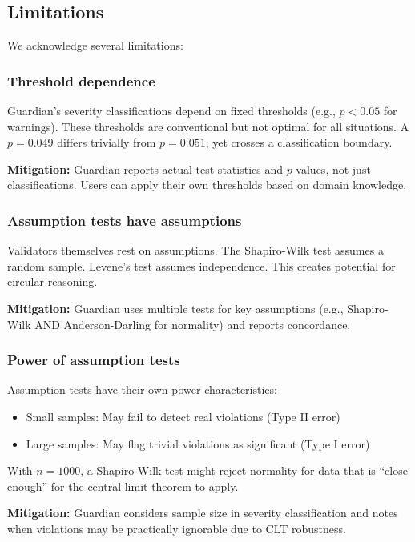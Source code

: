 \documentclass[article]{jss}
\begin{document}
\subsection{Limitations}

We acknowledge several limitations:

\subsubsection{Threshold dependence}

Guardian's severity classifications depend on fixed thresholds (e.g., $p < 0.05$ for warnings). These thresholds are conventional but not optimal for all situations. A $p = 0.049$ differs trivially from $p = 0.051$, yet crosses a classification boundary.

\textbf{Mitigation:} Guardian reports actual test statistics and $p$-values, not just classifications. Users can apply their own thresholds based on domain knowledge.

\subsubsection{Assumption tests have assumptions}

Validators themselves rest on assumptions. The Shapiro-Wilk test assumes a random sample. Levene's test assumes independence. This creates potential for circular reasoning.

\textbf{Mitigation:} Guardian uses multiple tests for key assumptions (e.g., Shapiro-Wilk AND Anderson-Darling for normality) and reports concordance.

\subsubsection{Power of assumption tests}

Assumption tests have their own power characteristics:
\begin{itemize}
\item Small samples: May fail to detect real violations (Type II error)
\item Large samples: May flag trivial violations as significant (Type I error)
\end{itemize}

With $n = 1000$, a Shapiro-Wilk test might reject normality for data that is ``close enough'' for the central limit theorem to apply.

\textbf{Mitigation:} Guardian considers sample size in severity classification and notes when violations may be practically ignorable due to CLT robustness.
\end{document}
